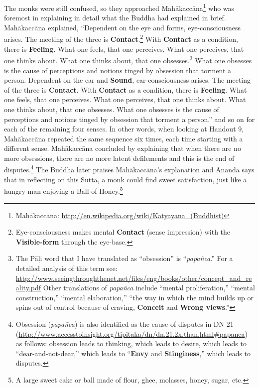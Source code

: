 The monks were still confused, so they approached Mahākaccāna\footnote{Mahākaccāna: \url{http://en.wikipedia.org/wiki/Katyayana_(Buddhist)}} who was foremost in explaining in detail what the Buddha had explained in brief. Mahākaccāna explained, “Dependent on the eye and forms, eye-consciousness arises. The meeting of the three is \textbf{Contact}.\footnote{Eye-consciousness makes mental \textbf{Contact} (sense impression) with the \textbf{Visible-form} through the eye-base.} With \textbf{Contact} as a condition, there is \textbf{Feeling}. What one feels, that one perceives. What one perceives, that one thinks about. What one thinks about, that one obsesses.\footnote{The Pāḷi word that I have translated as “obsession” is “\textit{papañca}.” For a detailed analysis of this term see: \url{http://www.seeingthroughthenet.net/files/eng/books/other/concept_and_reality.pdf} Other translations of \textit{papañca} include “mental proliferation,” “mental construction,” “mental elaboration,” “the way in which the mind builds up or spins out of control because of craving, \textbf{Conceit} and \textbf{Wrong views}.”} What one obsesses is the cause of perceptions and notions tinged by obsession that torment a person. Dependent on the ear and \textbf{Sound}, ear-consciousness arises. The meeting of the three is \textbf{Contact}. With \textbf{Contact} as a condition, there is \textbf{Feeling}. What one feels, that one perceives. What one perceives, that one thinks about. What one thinks about, that one obsesses. What one obsesses is the cause of perceptions and notions tinged by obsession that torment a person.” and so on for each of the remaining four senses. In other words, when looking at Handout 9, Mahākaccāna repeated the same sequence six times, each time starting with a different sense. Mahākaccāna concluded by explaining that when there are no more obsessions, there are no more latent defilements and this is the end of disputes.\footnote{Obsession (\textit{papañca}) is also identified as the cause of disputes in DN 21 (\url{http://www.accesstoinsight.org/tipitaka/dn/dn.21.2x.than.html\#papanca}) as follows: obsession leads to thinking, which leads to desire, which leads to “dear-and-not-dear,” which leads to “\textbf{Envy} and \textbf{Stinginess},” which leads to disputes.} The Buddha later praises Mahākaccāna’s explanation and Ānanda says that in reflecting on this Sutta, a monk could find sweet satisfaction, just like a hungry man enjoying a Ball of Honey.\footnote{A large sweet cake or ball made of flour, ghee, molasses, honey, sugar, etc.}

